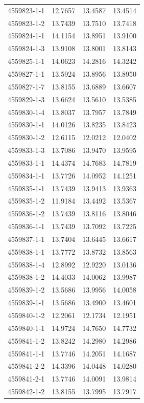 \begin{longtable}{lrrr}
4559823-1-1 & 12.7657 & 13.4587 & 13.4514 \\
4559823-1-2 & 13.7439 & 13.7510 & 13.7418 \\
4559824-1-1 & 14.1154 & 13.8951 & 13.9100 \\
4559824-1-3 & 13.9108 & 13.8001 & 13.8143 \\
4559825-1-1 & 14.0623 & 14.2816 & 14.3242 \\
4559827-1-1 & 13.5924 & 13.8956 & 13.8950 \\
4559827-1-7 & 13.8155 & 13.6889 & 13.6607 \\
4559829-1-3 & 13.6624 & 13.5610 & 13.5385 \\
4559830-1-4 & 13.8037 & 13.7957 & 13.7849 \\
4559830-1-1 & 14.0126 & 13.8235 & 13.8423 \\
4559830-1-2 & 12.6115 & 12.0212 & 12.0402 \\
4559833-1-3 & 13.7086 & 13.9470 & 13.9595 \\
4559833-1-1 & 14.4374 & 14.7683 & 14.7819 \\
4559834-1-1 & 13.7726 & 14.0952 & 14.1251 \\
4559835-1-1 & 13.7439 & 13.9413 & 13.9363 \\
4559835-1-2 & 11.9184 & 13.4492 & 13.5367 \\
4559836-1-2 & 13.7439 & 13.8116 & 13.8046 \\
4559836-1-1 & 13.7439 & 13.7092 & 13.7225 \\
4559837-1-1 & 13.7404 & 13.6445 & 13.6617 \\
4559838-1-1 & 13.7772 & 13.8732 & 13.8563 \\
4559838-1-4 & 12.8992 & 12.9220 & 13.0136 \\
4559838-1-2 & 14.4033 & 14.0062 & 13.9987 \\
4559839-1-2 & 13.5686 & 13.9956 & 14.0058 \\
4559839-1-1 & 13.5686 & 13.4900 & 13.4601 \\
4559840-1-2 & 12.2061 & 12.1734 & 12.1951 \\
4559840-1-1 & 14.9724 & 14.7650 & 14.7732 \\
4559841-1-2 & 13.8242 & 14.2980 & 14.2986 \\
4559841-1-1 & 13.7746 & 14.2051 & 14.1687 \\
4559841-2-2 & 14.3396 & 14.0448 & 14.0280 \\
4559841-2-1 & 13.7746 & 14.0091 & 13.9814 \\
4559842-1-2 & 13.8155 & 13.7995 & 13.7917 \\

\end{longtable}

